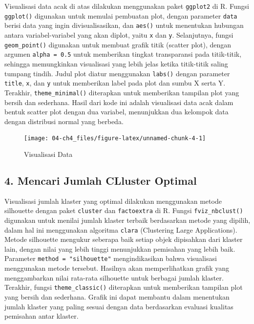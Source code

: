 \documentclass[
  oneside]{book}
\begin{document}
Visualisasi data acak di atas dilakukan menggunakan paket \texttt{ggplot2} di R. Fungsi \texttt{ggplot()} digunakan untuk memulai pembuatan plot, dengan parameter \texttt{data} berisi data yang ingin divisualisasikan, dan \texttt{aes()} untuk menentukan hubungan antara variabel-variabel yang akan diplot, yaitu \texttt{x} dan \texttt{y}. Selanjutnya, fungsi \texttt{geom\_point()} digunakan untuk membuat grafik titik (scatter plot), dengan argumen \texttt{alpha\ =\ 0.5} untuk memberikan tingkat transparansi pada titik-titik, sehingga memungkinkan visualisasi yang lebih jelas ketika titik-titik saling tumpang tindih. Judul plot diatur menggunakan \texttt{labs()} dengan parameter \texttt{title}, \texttt{x}, dan \texttt{y} untuk memberikan label pada plot dan sumbu X serta Y. Terakhir, \texttt{theme\_minimal()} diterapkan untuk memberikan tampilan plot yang bersih dan sederhana. Hasil dari kode ini adalah visualisasi data acak dalam bentuk scatter plot dengan dua variabel, menunjukkan dua kelompok data dengan distribusi normal yang berbeda.

\begin{figure}[h]

{\centering \texttt{[image: 04-ch4\_files/figure-latex/unnamed-chunk-4-1]} 

}

\caption{Visualisasi Data}\label{fig:unnamed-chunk-4}
\end{figure}

\subsection*{4. Mencari Jumlah CLluster Optimal}\label{mencari-jumlah-clluster-optimal}

Visualisasi jumlah klaster yang optimal dilakukan menggunakan metode silhouette dengan paket \texttt{cluster} dan \texttt{factoextra} di R. Fungsi \texttt{fviz\_nbclust()} digunakan untuk menilai jumlah klaster terbaik berdasarkan metode yang dipilih, dalam hal ini menggunakan algoritma \texttt{clara} (Clustering Large Applications). Metode silhouette mengukur seberapa baik setiap objek dipisahkan dari klaster lain, dengan nilai yang lebih tinggi menunjukkan pemisahan yang lebih baik. Parameter \texttt{method\ =\ "silhouette"} mengindikasikan bahwa visualisasi menggunakan metode tersebut. Hasilnya akan memperlihatkan grafik yang menggambarkan nilai rata-rata silhouette untuk berbagai jumlah klaster. Terakhir, fungsi \texttt{theme\_classic()} diterapkan untuk memberikan tampilan plot yang bersih dan sederhana. Grafik ini dapat membantu dalam menentukan jumlah klaster yang paling sesuai dengan data berdasarkan evaluasi kualitas pemisahan antar klaster.
\end{document}
